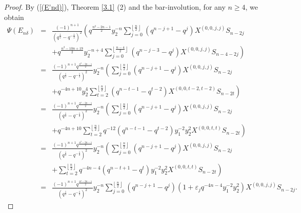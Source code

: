\documentclass[reqno,11pt]{amsart}
\numberwithin{equation}{section}
\begin{document}
\begin{proof}
	By (\ref{(E'nd)}), Theorem \ref{3.1} (2) and the bar-involution, for any $n\geq 4$, we obtain
\begin{eqnarray*}
	\Psi \left( {{E_{n\delta }}} \right)& =& \frac{{{{( - 1)}^{n + 1}}}}{{{{\left( {{q^{\frac{1}{2}}} - {q^{ - \frac{1}{2}}}} \right)}^2}}}\left( {{q^{\frac{{{n^2} - 2n - 1}}{2}}}y_2^{ - n}\sum\limits_{j = 0}^{\left\lfloor {\frac{n}{2}} \right\rfloor } {\left( {{q^{n - j + 1}} - {q^j}} \right){X^{(0,0,j,j)}}{S_{n - 2j}}} } \right.\\
&&	\left. { + {q^{\frac{{{n^2} - 10n + 19}}{2}}}y_2^{ - n + 4}\sum\limits_{j = 0}^{\left\lfloor {\frac{{n - 4}}{2}} \right\rfloor } {\left( {{q^{n - j - 3}} - {q^j}} \right){X^{(0,0,j,j)}}{S_{n - 4 - 2j}}} } \right)\\
&	=& \frac{{{{( - 1)}^{n + 1}}{q^{\frac{{{n^2} - 2n - 1}}{2}}}}}{{{{\left( {{q^{\frac{1}{2}}} - {q^{ - \frac{1}{2}}}} \right)}^2}}}y_2^{ - n}\left( {\sum\limits_{j = 0}^{\left\lfloor {\frac{n}{2}} \right\rfloor } {\left( {{q^{n - j + 1}} - {q^j}} \right){X^{(0,0,j,j)}}{S_{n - 2j}}} } \right.\\
&&	\left. { + {q^{ - 4n + 10}}y_2^4\sum\limits_{t = 2}^{\left\lfloor {\frac{n}{2}} \right\rfloor } {\left( {{q^{n - t - 1}} - {q^{t - 2}}} \right){X^{(0,0,t - 2,t - 2)}}{S_{n - 2t}}} } \right)\\
&	= &\frac{{{{( - 1)}^{n + 1}}{q^{\frac{{{n^2} - 2n - 1}}{2}}}}}{{{{\left( {{q^{\frac{1}{2}}} - {q^{ - \frac{1}{2}}}} \right)}^2}}}y_2^{ - n}\left( {\sum\limits_{j = 0}^{\left\lfloor {\frac{n}{2}} \right\rfloor } {\left( {{q^{n - j + 1}} - {q^j}} \right){X^{(0,0,j,j)}}{S_{n - 2j}}} } \right.\\
&&	\left. { + {q^{ - 4n + 10}}\sum\limits_{t = 2}^{\left\lfloor {\frac{n}{2}} \right\rfloor } {{q^{  - 12}}\left( {{q^{n - t - 1}} - {q^{t - 2}}} \right)y_1^{ - 2}y_2^2{X^{(0,0,t,t)}}{S_{n - 2t}}} } \right)\\
&	=&\frac{{{{( - 1)}^{n + 1}}{q^{\frac{{{n^2} - 2n - 1}}{2}}}}}{{{{\left( {{q^{\frac{1}{2}}} - {q^{ - \frac{1}{2}}}} \right)}^2}}}y_2^{ - n}\left( {\sum\limits_{j = 0}^{\left\lfloor {\frac{n}{2}} \right\rfloor } {\left( {{q^{n - j + 1}} - {q^j}} \right){X^{(0,0,j,j)}}{S_{n - 2j}}} } \right.\\
&&	\left. { + \sum\limits_{t = 2}^{\left\lfloor {\frac{n}{2}} \right\rfloor } {{q^{ - 4n  - 4}}\left( {{q^{n - t + 1}} - {q^t}} \right)y_1^{ - 2}y_2^2{X^{(0,0,t,t)}}{S_{n - 2t}}} } \right)\\
&	=& \frac{{{{( - 1)}^{n + 1}}{q^{\frac{{{n^2} - 2n - 1}}{2}}}}}{{{{\left( {{q^{\frac{1}{2}}} - {q^{ - \frac{1}{2}}}} \right)}^2}}}y_2^{ - n}\sum\limits_{j = 0}^{\left\lfloor {\frac{n}{2}} \right\rfloor } {\left( {{q^{n - j + 1}} - {q^j}} \right)\left( {1 + \varepsilon_j{q^{ - 4n  - 4}}y_1^{ - 2}y_2^2} \right){X^{(0,0,j,j)}}{S_{n - 2j}}} .

\end{eqnarray*}
\end{proof}
\end{document}
